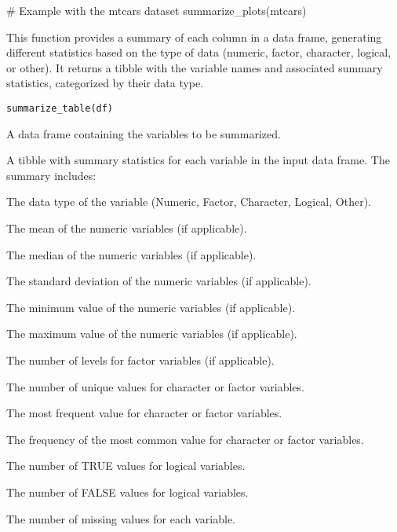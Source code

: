 \documentclass[a4paper]{book}
\begin{document}
%
\begin{Examples}
\begin{ExampleCode}
# Example with the mtcars dataset
summarize_plots(mtcars)

\end{ExampleCode}
\end{Examples}
%
\begin{Description}
This function provides a summary of each column in a data frame, generating different statistics based on the type of data (numeric, factor, character, logical, or other).
It returns a tibble with the variable names and associated summary statistics, categorized by their data type.
\end{Description}
%
\begin{Usage}
\begin{verbatim}
summarize_table(df)
\end{verbatim}
\end{Usage}
%
\begin{Arguments}
\begin{ldescription}
\item[\code{df}] A data frame containing the variables to be summarized.
\end{ldescription}
\end{Arguments}
%
\begin{Value}
A tibble with summary statistics for each variable in the input data frame. The summary includes:
\begin{ldescription}
\item[\code{Type}] The data type of the variable (Numeric, Factor, Character, Logical, Other).
\item[\code{Mean}] The mean of the numeric variables (if applicable).
\item[\code{Median}] The median of the numeric variables (if applicable).
\item[\code{SD}] The standard deviation of the numeric variables (if applicable).
\item[\code{Min}] The minimum value of the numeric variables (if applicable).
\item[\code{Max}] The maximum value of the numeric variables (if applicable).
\item[\code{Levels}] The number of levels for factor variables (if applicable).
\item[\code{Unique}] The number of unique values for character or factor variables.
\item[\code{Most\_Common}] The most frequent value for character or factor variables.
\item[\code{Frequency}] The frequency of the most common value for character or factor variables.
\item[\code{True\_Count}] The number of TRUE values for logical variables.
\item[\code{False\_Count}] The number of FALSE values for logical variables.
\item[\code{NA\_Count}] The number of missing values for each variable.
\end{ldescription}
\end{Value}
\end{document}

